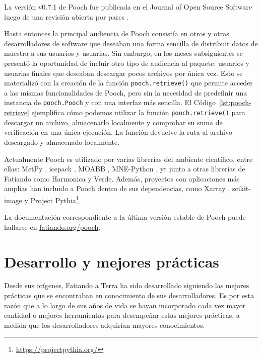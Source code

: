 La versión v0.7.1 de Pooch fue publicada en el Journal of Open Source
Software luego de una revisión abierta por pares \citep{pooch2020}.



Hasta entonces la principal audiencia de Pooch consistía en otros y otras
desarrolladores de software que deseaban una forma sencilla de distribuir datos
de muestra a sus usuarios y usuarias.
Sin embargo, en los meses subsiguientes se presentó la oportunidad de incluir
otro tipo de audiencia al paquete: usuarios y usuarias finales que deseaban
descargar pocos archivos por única vez.
Esto se materializó con la creación de la función \texttt{pooch.retrieve()} que
permite acceder a las mismas funcionalidades de Pooch, pero sin la
necesidad de predefinir una instancia de \texttt{pooch.Pooch} y con una
interfaz más sencilla.
El Código~\ref{lst:pooch-retrieve} ejemplifica cómo podemos utilizar la función
\texttt{pooch.retrieve()} para descargar un archivo, almacenarlo localmente
y comprobar su suma de verificación en una única ejecución.
La función devuelve la ruta al archivo descargado y almacenado localmente.

Actualmente Pooch es utilizado por varias librerías del ambiente
científico, entre ellas: MetPy \citep{metpy}, icepack \citep{icepack}, MOABB
\citep{moabb}, MNE-Python \citep{mnepython}, yt \citep{yt2010} junto a otras
librerías de Fatiando como Harmonica y Verde.
Además, proyectos con aplicaciones más amplias han incluido a Pooch
dentro de sus dependencias, como Xarray \citep{xarray2017}, scikit-image
\citep{skimage} y Project Pythia\footnote{\url{https://projectpythia.org/}}.

La documentación correspondiente a la última versión estable de Pooch
puede hallarse en \href{https://www.fatiando.org/pooch}{fatiando.org/pooch}.


\section{Desarrollo y mejores prácticas}
\label{sec:best-practices}

Desde sus orígenes, Fatiando a Terra ha sido desarrollado siguiendo las mejores
prácticas que se encontraban en conocimiento de sus desarrolladores.
Es por esta razón que a lo largo de sus años de vida se hayan incorporado cada
vez mayor cantidad o mejores herramientas para desempeñar estas mejores
prácticas, a medida que los desarrolladores adquirían mayores conocimientos.

